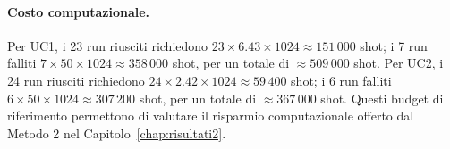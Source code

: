 \begin{onehalfspace}
\paragraph{Costo computazionale.}
Per UC1, i 23 run riusciti richiedono $23 \times 6.43 \times 1024 \approx 151\,000$ shot; i 7 run falliti $7 \times 50 \times 1024 \approx 358\,000$ shot, per un totale di $\approx 509\,000$ shot. Per UC2, i 24 run riusciti richiedono $24 \times 2.42 \times 1024 \approx 59\,400$ shot; i 6 run falliti $6 \times 50 \times 1024 \approx 307\,200$ shot, per un totale di $\approx 367\,000$ shot. Questi budget di riferimento permettono di valutare il risparmio computazionale offerto dal Metodo 2 nel Capitolo~\ref{chap:risultati2}.

\end{onehalfspace}
